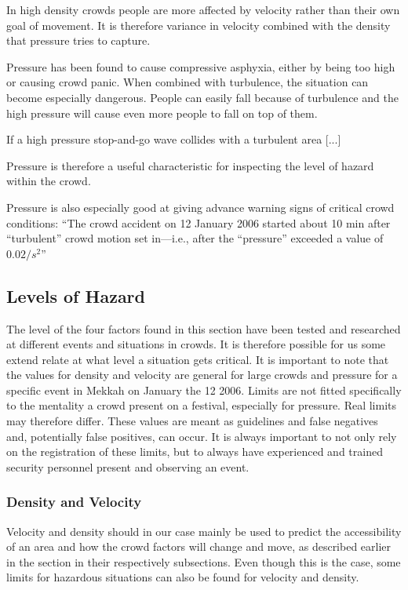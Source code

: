 In high density crowds people are more affected by velocity rather than their own goal of movement. It is therefore variance in velocity combined with the density that pressure tries to capture.

Pressure has been found to cause compressive asphyxia, either by being too high or causing crowd panic. When combined with turbulence, the situation can become especially dangerous. People can easily fall because of turbulence and the high pressure will cause even more people to fall on top of them.

If a high pressure stop-and-go wave collides with a turbulent area [...]

Pressure is therefore a useful characteristic for inspecting the level of hazard within the crowd.

Pressure is also especially good at giving advance warning signs of critical crowd conditions: \enquote{The crowd accident on 12 January 2006 started about 10 min after “turbulent” crowd motion set in—i.e., after the “pressure” exceeded a value of $0.02/s^2$}

\subsection{Levels of Hazard}
\label{subsec:levelsOfHazard}
The level of the four factors found in this section have been tested and researched at different events and situations in crowds. It is therefore possible for us some extend relate at what level a situation gets critical. It is important to note that the values for density and velocity are general for large crowds and pressure for a specific event in Mekkah on January the 12 2006. Limits are not fitted specifically to the mentality a crowd present on a festival, especially for pressure. Real limits may therefore differ. These values are meant as guidelines and false negatives and, potentially false positives, can occur. It is always important to not only rely on the registration of these limits, but to always have experienced and trained security personnel present and observing an event.

\subsubsection{Density and Velocity}
Velocity and density should in our case mainly be used to predict the accessibility of an area and how the crowd factors will change and move, as described earlier in the section in their respectively subsections. Even though this is the case, some limits for hazardous situations can also be found for velocity and density.

